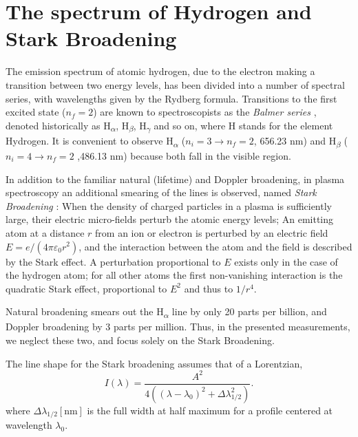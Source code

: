 \documentclass[justified,nofonts,nobib]{tufte-book}
\begin{document}
\section{The spectrum of Hydrogen and Stark Broadening}\label{sec:hydrogen}
The emission spectrum of atomic hydrogen, due to the electron making a transition between two energy levels, has been divided into a number of spectral series, with wavelengths given by the Rydberg formula. Transitions to the first excited state ($n_f=2$) are known to spectroscopists as the \textit{Balmer series} , denoted historically as H\textsubscript{$\alpha$}, H\textsubscript{$\beta$}, H\textsubscript{$\gamma$} and so on, where H stands for the element Hydrogen. It is convenient to observe H\textsubscript{$\alpha$} ($n_i=3 \to n_f=2$, 656.23 nm) and H\textsubscript{$\beta$} ($n_i=4 \to n_f=2$ ,486.13 nm) because both fall in the visible region.

In addition to the familiar natural (lifetime) and Doppler broadening, in plasma spectroscopy an additional smearing of the lines is observed, named \textit{Stark Broadening} : When the density of charged particles in a plasma is sufficiently large, their electric micro-fields perturb the atomic energy levels\cite{Griem1974SpectralPlasmas.}; An emitting atom at a distance $r$ from an ion or electron is perturbed by an electric field $E=e/(4\pi \varepsilon_0 r^2)$, and the interaction between the atom and the field is described by the Stark effect. A perturbation proportional to $E$ exists only in the case of the hydrogen atom; for all other atoms the first non-vanishing interaction is the quadratic Stark effect\cite{Thorne1988Spectrophysics}, proportional to $E^2$ and thus to $1/r^4$.

Natural broadening smears out the H\textsubscript{$\alpha$} line by only 20 parts per billion, and Doppler broadening by 3 parts per million. Thus, in the presented measurements, we neglect these two, and focus solely on the Stark Broadening.

The line shape for the Stark broadening assumes that of a Lorentzian,
\begin{equation}
I\left( \lambda \right)=\frac{A^2}{4\left( \left(\lambda-\lambda_0\right)^2+\Delta \lambda_{1/2}^2\right)}. \label{eq:Stark_Broadening}
\end{equation}
where $\Delta \lambda_{1/2}\left[\si{\nm}\right]$ is the full width at half maximum for a profile centered at wavelength $\lambda_0$.
\end{document}
